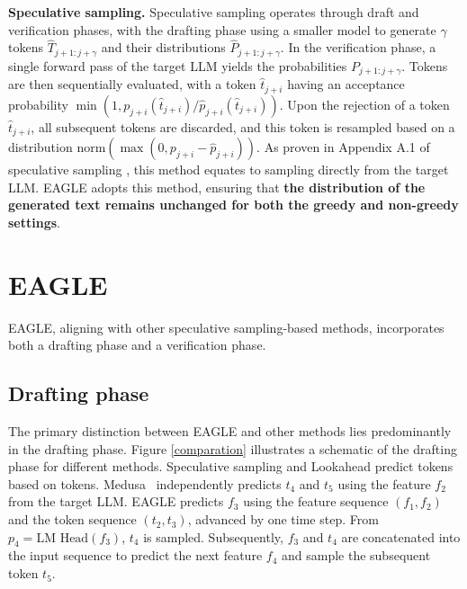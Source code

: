 \documentclass{article}
\theoremstyle{plain}
\theoremstyle{definition}
\theoremstyle{remark}
\begin{document}
\textbf{Speculative sampling.} 
Speculative sampling operates through draft and verification phases, with the drafting phase using a smaller model to generate $\gamma$ tokens $\hat{T}_{j+1:j+\gamma}$ and their distributions $\hat{P}_{j+1:j+\gamma}$. In the verification phase, a single forward pass of the target LLM yields the probabilities $P_{j+1:j+\gamma}$. Tokens are then sequentially evaluated, with a token $\hat{t}_{j+i}$ having an acceptance probability $\min(1,p_{j+i}(\hat{t}_{j+i})/\hat{p}_{j+i}(\hat{t}_{j+i}))$. Upon the rejection of a token $\hat{t}_{j+i}$, all subsequent tokens are discarded, and this token is resampled based on a distribution $\text{norm}(\max(0,p_{j+i}-\hat{p}_{j+i}))$. As proven in Appendix A.1 of speculative sampling \cite{leviathan2023fast}, this method equates to sampling directly from the target LLM. EAGLE adopts this method, ensuring that \textbf{the distribution of the generated text remains unchanged for both the greedy and non-greedy settings}.


\section{EAGLE}

EAGLE, aligning with other speculative sampling-based methods, incorporates both a drafting phase and a verification phase.



\subsection{Drafting phase}
\label{me:draft}


The primary distinction between EAGLE and other methods lies predominantly in the drafting phase.
Figure \ref{comparation} illustrates a schematic of the drafting phase for different methods. Speculative sampling \cite{leviathan2023fast,chen2023accelerating} and Lookahead \cite{fu2023lookahead} predict tokens based on tokens. Medusa~\cite{medusa} independently predicts $t_4$ and $t_5$ using the feature $f_2$ from the target LLM. EAGLE predicts $f_3$ using the feature sequence $(f_1,f_2)$ and the token sequence $(t_2,t_3)$, advanced by one time step. From $p_4=\text{LM Head}(f_3)$, $t_4$ is sampled. Subsequently, $f_3$ and $t_4$ are concatenated into the input sequence to predict the next feature $f_4$ and sample the subsequent token $t_5$.

\end{document}
